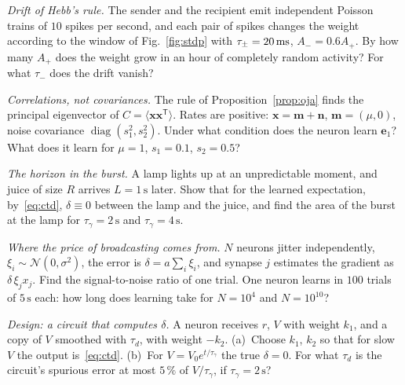 \begin{exercise}[\lvlA]
\label{ex:06:2}
\emph{Drift of Hebb's rule.} The sender and the recipient emit independent Poisson trains of $10$ spikes per second, and each pair of spikes changes the weight according to the window of Fig.~\ref{fig:stdp} with $\tau_\pm=20\,\text{ms}$, $A_-=0.6A_+$. By how many $A_+$ does the weight grow in an hour of completely random activity? For what $\tau_-$ does the drift vanish?
\end{exercise}

\begin{exercise}[\lvlB]
\label{ex:06:3}
\emph{Correlations, not covariances.} The rule of Proposition~\ref{prop:oja} finds the principal eigenvector of $C=\langle\mathbf x\mathbf x^{\mathsf T}\rangle$. Rates are positive: $\mathbf x=\mathbf m+\mathbf n$, $\mathbf m=(\mu,0)$, noise covariance $\operatorname{diag}(s_1^2,s_2^2)$. Under what condition does the neuron learn $\mathbf e_1$? What does it learn for $\mu=1$, $s_1=0.1$, $s_2=0.5$?
\end{exercise}

\begin{exercise}[\lvlA]
\label{ex:06:4}
\emph{The horizon in the burst.} A lamp lights up at an unpredictable moment, and juice of size $R$ arrives $L=1\,\text{s}$ later. Show that for the learned expectation, by~\eqref{eq:ctd}, $\delta\equiv0$ between the lamp and the juice, and find the area of the burst at the lamp for $\tau_\gamma=2\,\text{s}$ and $\tau_\gamma=4\,\text{s}$.
\end{exercise}

\begin{exercise}[\lvlB]
\label{ex:06:5}
\emph{Where the price of broadcasting comes from.} $N$ neurons jitter independently, $\xi_i\sim\mathcal N(0,\sigma^2)$, the error is $\delta=a\sum_i\xi_i$, and synapse $j$ estimates the gradient as $\delta\,\xi_jx_j$. Find the signal-to-noise ratio of one trial. One neuron learns in $100$ trials of $5\,\text{s}$ each: how long does learning take for $N=10^4$ and $N=10^{10}$?
\end{exercise}

\begin{exercise}[\lvlB]
\label{ex:06:6}
\emph{Design: a circuit that computes $\delta$.} A  neuron receives $r$, $V$ with weight $k_1$, and a copy of $V$ smoothed with $\tau_d$, with weight $-k_2$. (a)~Choose $k_1$, $k_2$ so that for slow $V$ the output is~\eqref{eq:ctd}. (b)~For $V=V_0e^{t/\tau_\gamma}$ the true $\delta=0$. For what $\tau_d$ is the circuit's spurious error at most $5\,\%$ of $V/\tau_\gamma$, if $\tau_\gamma=2\,\text{s}$?
\end{exercise}

